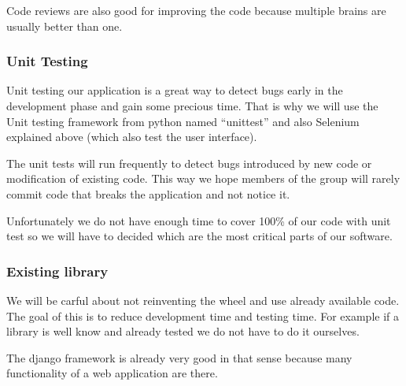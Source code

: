 \documentclass[11pt, a4paper]{article}   	%
\begin{document}
Code reviews are also good for improving the code because multiple brains are usually better than one. 
 
\subsubsection{Unit Testing} 
 
Unit testing our application is a great way to detect bugs early in the development phase and gain some precious time. That is why we will use the Unit testing framework from python named \enquote{unittest} and also Selenium explained above (which also test the user interface). 
 
The unit tests will run frequently to detect bugs introduced by new code or modification of existing code. This way we hope members of the group will rarely commit code that breaks the application and not notice it. 
 
Unfortunately we do not have enough time to cover 100\% of our code with unit test so we will have to decided which are the most critical parts of our software. 
 
\subsubsection{Existing library} 
 
We will be carful about not reinventing the wheel and use already available code. The goal of this is to reduce development time and testing time.  
For example if a library is well know and already tested we do not have to do it ourselves. 
 
The django framework is already very good in that sense because many functionality of a web application are there.
 
\end{document}
